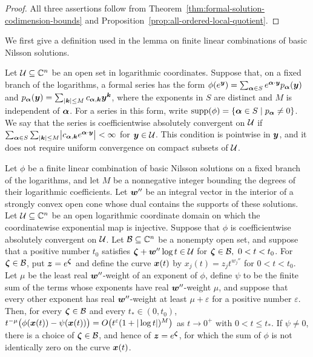 \begin{proof}
	All three assertions follow from Theorem~\ref{thm:formal-solution-codimension-bounds} and Proposition~\ref{prop:all-ordered-local-quotient}.
\end{proof}

We first give a definition used in the lemma on finite linear combinations of basic Nilsson solutions.

\begin{definition}
	\label{def:coefficientwise-absolute-convergence}
	Let \(\mathcal U\subseteq\mathbb C^n\) be an open set in logarithmic coordinates.
	Suppose that, on a fixed branch of the logarithms, a formal series has the form \(\phi(e^{\boldsymbol{y}}) = \sum_{\boldsymbol{\alpha}\in S}e^{\boldsymbol{\alpha}\cdot\boldsymbol{y}}p_{\boldsymbol{\alpha}}(\boldsymbol{y})\) and \(p_{\boldsymbol{\alpha}}(\boldsymbol{y}) = \sum_{|\boldsymbol{k}|\leq M}c_{\boldsymbol{\alpha},\boldsymbol{k}}\boldsymbol{y}^{\boldsymbol{k}}\), where the exponents in \(S\) are distinct and \(M\) is independent of \(\boldsymbol{\alpha}\).
	For a series in this form, write \(\operatorname{supp}(\phi)=\{\boldsymbol{\alpha}\in S\mid p_{\boldsymbol{\alpha}}\ne0\}\).
	We say that the series is coefficientwise absolutely convergent on \(\mathcal U\) if \(\sum_{\boldsymbol{\alpha}\in S} \sum_{|\boldsymbol{k}|\leq M} \bigl|c_{\boldsymbol{\alpha},\boldsymbol{k}}e^{\boldsymbol{\alpha}\cdot\boldsymbol{y}}\bigr| < \infty\) for \(\boldsymbol{y}\in\mathcal U\).
	This condition is pointwise in \(\boldsymbol{y}\), and it does not require uniform convergence on compact subsets of \(\mathcal U\).
\end{definition}

\begin{lemma}
	\label{lem:nilsson-asymptotic-injectivity}
	Let \(\phi\) be a finite linear combination of basic Nilsson solutions on a fixed branch of the logarithms, and let \(M\) be a nonnegative integer bounding the degrees of their logarithmic coefficients.
	Let \(\boldsymbol{w}''\) be an integral vector in the interior of a strongly convex open cone whose dual contains the supports of these solutions.
	Let \(\mathcal U\subseteq\mathbb C^n\) be an open logarithmic coordinate domain on which the coordinatewise exponential map is injective.
	Suppose that \(\phi\) is coefficientwise absolutely convergent on \(\mathcal U\).
	Let \(\mathcal B\subseteq\mathbb C^n\) be a nonempty open set, and suppose that a positive number \(t_0\) satisfies \(\boldsymbol{\zeta}+\boldsymbol{w}''\log t\in\mathcal U\) for \(\boldsymbol{\zeta}\in\mathcal B,\ 0<t<t_0\).
	For \(\boldsymbol{\zeta}\in\mathcal B\), put \(\boldsymbol{z}=e^{\boldsymbol{\zeta}}\) and define the curve \(\boldsymbol{x}(t)\) by \(x_j(t)=z_jt^{w_j''}\) for \(0<t<t_0\).
	Let \(\mu\) be the least real \(\boldsymbol{w}''\)-weight of an exponent of \(\phi\), define \(\psi\) to be the finite sum of the terms whose exponents have real \(\boldsymbol{w}''\)-weight \(\mu\), and suppose that every other exponent has real \(\boldsymbol{w}''\)-weight at least \(\mu+\varepsilon\) for a positive number \(\varepsilon\).
	Then, for every \(\boldsymbol{\zeta}\in\mathcal B\) and every \(t_*\in(0,t_0)\), \(t^{-\mu}\bigl(\phi(\boldsymbol{x}(t))-\psi(\boldsymbol{x}(t))\bigr) = O\bigl(t^{\varepsilon}(1+|\log t|)^M\bigr)\) as \(t\to0^+\) with \(0<t\leq t_*\).
	If \(\psi\ne0\), there is a choice of \(\boldsymbol{\zeta}\in\mathcal B\), and hence of \(\boldsymbol{z}=e^{\boldsymbol{\zeta}}\), for which the sum of \(\phi\) is not identically zero on the curve \(\boldsymbol{x}(t)\).
\end{lemma}

